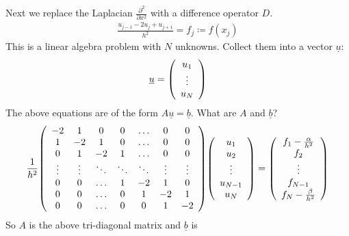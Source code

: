 \documentclass{article}
\begin{document}
        Next we replace the Laplacian $\frac{\partial^2}{\partial x^2}$ with a difference operator $D$.
        \begin{align*}
            \frac{u_{j-1} - 2u_{j} + u_{j+1}}{h^2} = f_j \coloneqq f(x_j)
        \end{align*}
        This is a linear algebra problem with $N$ unknowns.  Collect them into a vector $\underline{u}$:
        \begin{align*}
            \underline{u} = \qty(\begin{array}{c}
                u_1 \\ \vdots \\ u_N
            \end{array})
        \end{align*}
        The above equations are of the form $A\underline{u} = \underline{b}$.  What are $A$ and $\underline{b}$?
        \begin{align*}
            \frac{1}{h^2}\qty(\begin{array}{ccccccc}
                -2 & 1 & 0 & 0 & \dots & 0 & 0 \\
                1 & -2 & 1 & 0 & \dots & 0 & 0 \\
                0 & 1 & -2 & 1 & \dots & 0 & 0 \\
                \vdots & \vdots & \ddots & \ddots & \ddots & \vdots & \vdots \\
                0 & 0 & \dots & 1 & -2 & 1 & 0 \\
                0 & 0 & \dots & 0 & 1 & -2 & 1 \\
                0 & 0 & \dots & 0 & 0 & 1 & -2
            \end{array})\qty(\begin{array}{c}
                u_1 \\ u_2 \\ \vdots \\ u_{N-1} \\ u_N
            \end{array}) = \qty(\begin{array}{c}
                f_1 - \frac{\alpha}{h^2} \\ f_2 \\ \vdots \\ f_{N-1} \\ f_N - \frac{\beta}{h^2}
            \end{array})
        \end{align*}
        So $A$ is the above tri-diagonal matrix and $\underline{b}$ is
\end{document}

